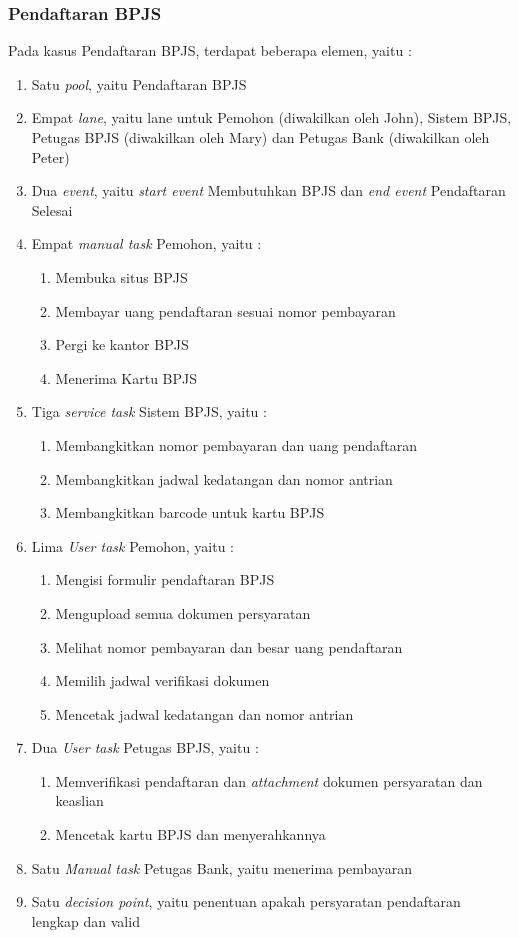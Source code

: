 \subsubsection{Pendaftaran BPJS}
\label{workflow_kasus2}
Pada kasus Pendaftaran BPJS, terdapat beberapa elemen, yaitu :
\begin{enumerate}
	\item Satu \textit{pool}, yaitu Pendaftaran BPJS
	\item Empat \textit{lane}, yaitu lane untuk Pemohon (diwakilkan oleh John), Sistem BPJS, Petugas BPJS (diwakilkan oleh Mary) dan Petugas Bank (diwakilkan oleh Peter)
	\item Dua \textit{event}, yaitu \textit{start event} Membutuhkan BPJS dan \textit{end event} Pendaftaran Selesai
	\item Empat \textit{manual task} Pemohon, yaitu : 
			\begin{enumerate}
				\item Membuka situs BPJS
				\item Membayar uang pendaftaran sesuai nomor pembayaran
				\item Pergi ke kantor BPJS
				\item Menerima Kartu BPJS
			\end{enumerate}
	\item Tiga \textit{service task} Sistem BPJS, yaitu :
			\begin{enumerate}
				\item Membangkitkan nomor pembayaran dan uang pendaftaran
				\item Membangkitkan jadwal kedatangan dan nomor antrian
				\item Membangkitkan barcode untuk kartu BPJS
			\end{enumerate}
	\item Lima \textit{User task} Pemohon, yaitu :
			\begin{enumerate}
				\item Mengisi formulir pendaftaran BPJS
				\item Mengupload semua dokumen persyaratan
				\item Melihat nomor pembayaran dan besar uang pendaftaran 
				\item Memilih jadwal verifikasi dokumen
				\item Mencetak jadwal kedatangan dan nomor antrian
			\end{enumerate}
	\item Dua \textit{User task} Petugas BPJS, yaitu :
			\begin{enumerate}
				\item Memverifikasi pendaftaran dan \textit{attachment} dokumen persyaratan dan keaslian
				\item Mencetak kartu BPJS dan menyerahkannya
			\end{enumerate}
	\item Satu \textit{Manual task} Petugas Bank, yaitu menerima pembayaran
	\item Satu \textit{decision point}, yaitu penentuan apakah persyaratan pendaftaran lengkap dan valid
\end{enumerate}


